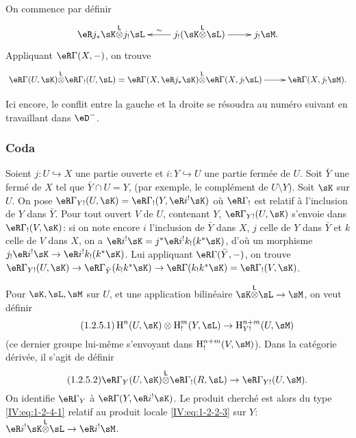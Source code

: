 On commence par définir 
\[\xymatrix{
  \eR j_* \sK\lotimes j_! \sL 
    & \ar[l]_-\sim j_!(\sK\lotimes \sL) \ar[r] 
    & j_!\sM \text{.}
}\]
Appliquant $\eR\Gamma(X,-)$, on trouve 
\[\xymatrix{
  \eR\Gamma(U,\sK)\lotimes\eR\Gamma_!(U,\sL) = \eR\Gamma(X,\eR j_*\sK)\lotimes \eR\Gamma(X,j_!\sL) \ar[r] 
    & \eR\Gamma(X,j_! \sM) \text{.}
}\]

Ici encore, le conflit entre la gauche et la droite se résoudra au numéro 
suivant en travaillant dans $\eD^-$. 





\subsubsection{Coda}\label{IV:1-2-5}

Soient $j:U\hookrightarrow X$ une partie ouverte et $i:Y\hookrightarrow U$ une 
partie fermée de $U$. Soit $\bar Y$ une fermé de $X$ tel que 
$\bar Y\cap U=Y$, (par exemple, le complément de $U\setminus Y$). Soit $\sK$ 
sur $U$. On pose $\eR\Gamma_{Y!}(U,\sK)=\eR\Gamma_!(Y,\eR i^!\sK)$ où 
$\eR\Gamma_!$ est relatif à l'inclusion de $Y$ dans $\bar Y$. Pour tout ouvert 
$V$ de $U$, contenant $Y$, $\eR\Gamma_{Y!}(U,\sK)$ s'envoie dans 
$\eR\Gamma_!(V,\sK)$: si on note encore $i$ l'inclusion de $\bar Y$ dans $X$, 
$j$ celle de $Y$ dans $\bar Y$ et $k$ celle de $V$ dans $X$, on a 
$\eR i^!\sK = j^*\eR i^! k_!(k^*\sK)$, d'où un morphisme 
$j_!\eR i^!\sK \to \eR i^! k_!(k^*\sK)$. Lui appliquant 
$\eR\Gamma(\bar Y,-)$, on trouve 
$\eR\Gamma_{Y!}(U,\sK)\to \eR\Gamma_{\bar Y}(k_! k^* \sK) \to \eR\Gamma(k_! k^*\sK) = \eR\Gamma_!(V,\sK)$. 

Pour $\sK,\sL,\sM$ sur $U$, et une application bilinéaire 
$\sK\lotimes\sL\to\sM$, on veut définir 
\begin{equation*}\tag{1.2.5.1}\label{IV:eq:1-2-5-1}
  \h^n(U,\sK)\otimes \h_!^m(Y,\sL) \to \h_{Y!}^{n+m}(U,\sM)
\end{equation*}
(ce dernier groupe lui-même s'envoyant dans $\h_!^{n+m}(V,\sM)$). Dans la 
catégorie dérivée, il s'agit de définir 
\begin{equation*}\tag{1.2.5.2}\label{IV:eq:1-2-5-2}
  \eR\Gamma_Y(U,\sK) \lotimes \eR\Gamma_!(R,\sL) \to \eR\Gamma_{Y!}(U,\sM) \text{.}
\end{equation*}
On identifie $\eR\Gamma_Y$ à $\eR\Gamma(Y,\eR i^!\sK)$. Le produit cherché 
est alors du type \eqref{IV:eq:1-2-4-1} relatif au produit locale 
\eqref{IV:eq:1-2-2-3} sur $Y$: $\eR i^! \sK\lotimes\sL \to \eR i^! \sM$. 





